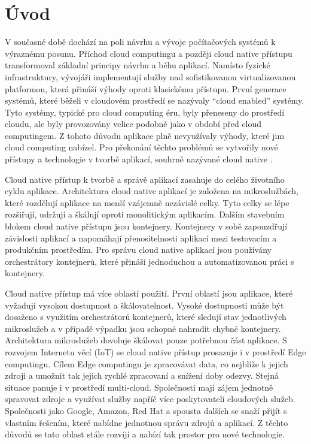 \chapter{Úvod}
\setcounter{page}{1}
V současné době dochází na poli návrhu a vývoje počítačových systémů k výraznému posunu. Příchod cloud computingu a později cloud native přístupu transformoval základní principy návrhu a běhu aplikací. Namísto fyzické infrastruktury, vývojáři implementují služby nad sofistikovanou virtualizovanou platformou, která přináší výhody oproti klasickému přístupu. První generace systémů, které běželi v cloudovém \linebreak prostředí se nazývaly “cloud enabled” systémy. Tyto systémy, typické pro cloud computing éru, byly přeneseny do prostředí cloudu, ale byly provozovány velice podobně jako v období před cloud computingem. Z tohoto důvodu aplikace plně nevyužívaly výhody, které jim cloud computing nabízel. Pro překonání těchto problémů se vytvořily nové přístupy a technologie v tvorbě aplikací, souhrně nazývané cloud native \cite{hotcloud}. 
\par
    Cloud native přístup k tvorbě a správě aplikací zasahuje do celého životního cyklu aplikace. Architektura cloud native aplikací je založena na mikroslužbách, které \newline rozdělují aplikace na menší vzájemně nezávislé celky. Tyto celky se lépe rozšiřují, udržují a škálují oproti monolitickým aplikacím. Dalším stavebním blokem cloud native přístupu jsou kontejnery. Kontejnery v sobě zapouzdřují závislosti aplikací a \newline napomáhají přenositelnosti aplikací mezi testovacím a produkčním prostředím. Pro správu cloud native aplikací jsou používány orchestrátory kontejnerů, které přináší jednoduchou a automatizovanou práci s kontejnery. 
	\par
        Cloud native přístup má více oblastí použití. První oblastí jsou aplikace, které \linebreak vyžadují vysokou dostupnost a škálovatelnost. Vysoké dostupnosti může být dosaženo s využitím orchestrátorů kontejnerů, které sledují stav jednotlivých mikroslužeb a v případě výpadku jsou schopné nahradit chybné kontejnery. Architektura mikroslužeb dovoluje škálovat pouze potřebnou část aplikace. S rozvojem Internetu věcí (IoT) se cloud native přístup prosazuje i v prostředí Edge computingu. Cílem Edge computingu je zpracovávat data, co nejblíže k jejich zdroji a umožnit tak jejich rychlé zpracovaní a snížení doby odezvy. Stejná situace panuje i v prostředí multi-cloud. Společnosti mají zájem jednotně spravovat zdroje a využívat služby napříč více poskytovateli cloudových služeb. Společnosti jako Google, Amazon, Red Hat a spousta dalších se snaží přijít s vlastním řešením, které nabídne jednotnou správu zdrojů a aplikací. Z těchto důvodů se tato oblast stále rozvíjí a nabízí tak prostor pro nové technologie.
